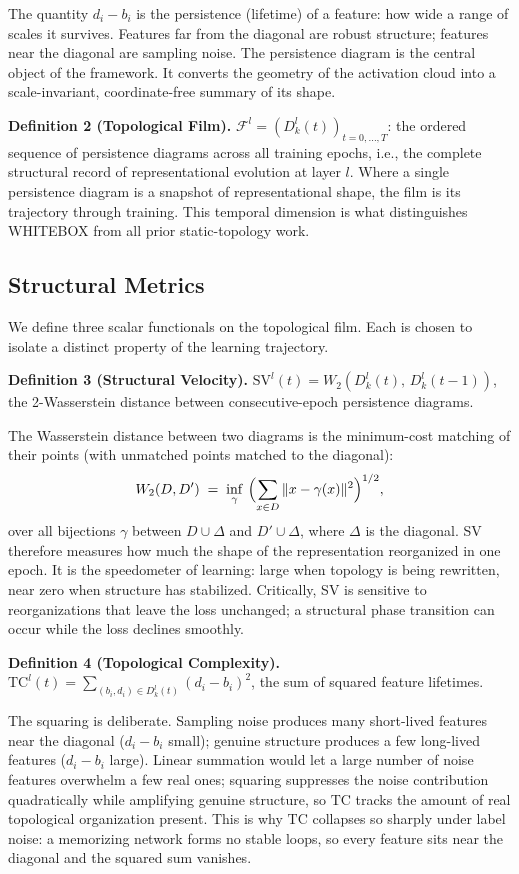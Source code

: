\documentclass[10pt]{article}
\newcommand{\TC}{\mathrm{TC}}
\newcommand{\SV}{\mathrm{SV}}
\begin{document}
The quantity $d_i-b_i$ is the persistence (lifetime) of a feature: how wide a range of scales it survives. Features far from the diagonal are robust structure; features near the diagonal are sampling noise. The persistence diagram is the central object of the framework. It converts the geometry of the activation cloud into a scale-invariant, coordinate-free summary of its shape.

\textbf{Definition 2 (Topological Film).} $\mathcal{F}^{l}=(D^{l}_{k}(t))_{t=0,\dots,T}$: the ordered sequence of persistence diagrams across all training epochs, i.e., the complete structural record of representational evolution at layer $l$. Where a single persistence diagram is a snapshot of representational shape, the film is its trajectory through training. This temporal dimension is what distinguishes WHITEBOX from all prior static-topology work.

\subsection{Structural Metrics}

We define three scalar functionals on the topological film. Each is chosen to isolate a distinct property of the learning trajectory.

\textbf{Definition 3 (Structural Velocity).} $\SV^{l}(t)=W_2(D^{l}_{k}(t),\,D^{l}_{k}(t-1))$, the 2-Wasserstein distance between consecutive-epoch persistence diagrams.

The Wasserstein distance between two diagrams is the minimum-cost matching of their points (with unmatched points matched to the diagonal):
\[
W_2(D,D') \;=\; \inf_{\gamma}\ \Bigl(\sum_{x\in D}\|x-\gamma(x)\|^{2}\Bigr)^{1/2},
\]
over all bijections $\gamma$ between $D\cup\Delta$ and $D'\cup\Delta$, where $\Delta$ is the diagonal. SV therefore measures how much the shape of the representation reorganized in one epoch. It is the speedometer of learning: large when topology is being rewritten, near zero when structure has stabilized. Critically, SV is sensitive to reorganizations that leave the loss unchanged; a structural phase transition can occur while the loss declines smoothly.

\textbf{Definition 4 (Topological Complexity).} $\TC^{l}(t)=\sum_{(b_i,d_i)\in D^{l}_{k}(t)}(d_i-b_i)^{2}$, the sum of squared feature lifetimes.

The squaring is deliberate. Sampling noise produces many short-lived features near the diagonal ($d_i-b_i$ small); genuine structure produces a few long-lived features ($d_i-b_i$ large). Linear summation would let a large number of noise features overwhelm a few real ones; squaring suppresses the noise contribution quadratically while amplifying genuine structure, so $\TC$ tracks the amount of real topological organization present. This is why $\TC$ collapses so sharply under label noise: a memorizing network forms no stable loops, so every feature sits near the diagonal and the squared sum vanishes.
\end{document}
